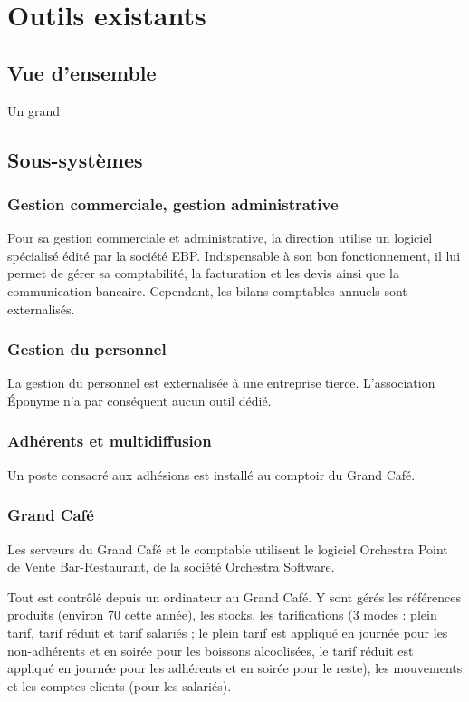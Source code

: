 \section{Outils existants}
\subsection{Vue d'ensemble}

Un grand 

\subsection{Sous-systèmes}

\subsubsection{Gestion commerciale, gestion administrative}

Pour sa gestion commerciale et administrative, la direction utilise un logiciel spécialisé
 édité par la société EBP.
Indispensable à son bon fonctionnement, il lui permet de gérer sa comptabilité, la facturation 
et les devis ainsi que la communication bancaire.
Cependant, les bilans comptables annuels sont externalisés.

\subsubsection{Gestion du personnel}

La gestion du personnel est externalisée à une entreprise tierce.
L'association Éponyme n'a par conséquent aucun outil dédié.


\subsubsection{Adhérents et multidiffusion}

Un poste consacré aux adhésions est installé au comptoir du Grand Café.

\subsubsection{Grand Café}

Les serveurs du Grand Café et le comptable utilisent le logiciel Orchestra
Point de Vente Bar-Restaurant, de la société Orchestra Software.

Tout est contrôlé depuis un ordinateur au Grand Café. Y sont gérés les
références produits (environ 70 cette année), les stocks, les tarifications
(3 modes : plein tarif, tarif réduit et tarif salariés ; le plein tarif
est appliqué en journée pour les non-adhérents et en soirée pour les boissons
alcoolisées, le tarif réduit est appliqué en journée pour les adhérents
et en soirée pour le reste), les mouvements et les comptes clients (pour les
salariés).

